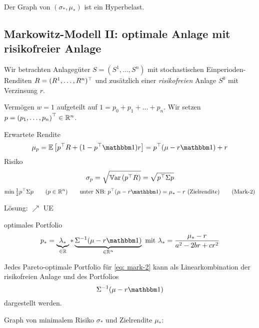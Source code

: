 Der Graph von $(\sigma_\ast, \mu_\ast)$ ist ein Hyperbelast.

\subsection{Markowitz-Modell II: optimale Anlage mit risikofreier Anlage}
Wir betrachten Anlagegüter $S = (S^1, \dots, S^n)$ mit stochastischen Einperioden-Renditen $R=\trans{(R^1, \dots, R^n)}$ und zusätzlich einer \textit{risikofreien} Anlage $S^0$ mit Verzinsung $r$.

Vermögen $w=1$ aufgeteilt auf $1 = p_0 + p_1 + \dots + p_n$. Wir setzen $p = \transpose{p_1, \dots, p_n} \in \Rn$. 

Erwartete Rendite
\begin{equation*}
	\mu_p = \EW[\trans{p} R + (1 - \trans{p}\one) r] = \trans{p} (\mu - r \one) + r
\end{equation*}
Risiko
\begin{equation*}
	\sigma_p = \sqrt{\Var[\trans{p}R]} = \sqrt{\trans{p} \Sigma p}
\end{equation*}
\begin{equation*}
	\min \tfrac{1}{2} \trans{p} \Sigma p \qquad (p \in \Rn) \qquad \text{unter NB: } \trans{p} (\mu - r\one) = \mu_\ast - r \text{ (Zielrendite)}
	\tag{Mark-2} \label{eq: mark-2}
\end{equation*}

Lösung: $\nearrow$ UE

optimales Portfolio
\begin{equation*}
	p_\ast = \underbrace{\lambda_\ast}_{\in \R} * \underbrace{\Sigma^{-1} (\mu - r \one)}_{\in \Rn} \mit \lambda_\ast = \frac{\mu_\ast - r}{a^2 - 2br + cr^2}
\end{equation*}

\begin{korollar}
	Jedes Pareto-optimale Portfolio für \eqref{eq: mark-2} kann als Linearkombination der risikofreien Anlage und des Portfolios 
	\begin{equation*}
		\Sigma^{-1} (\mu - r \one)
	\end{equation*}
	dargestellt werden.
\end{korollar}

Graph von minimalem Risiko $\sigma_\ast$ und Zielrendite $\mu_\ast$:


